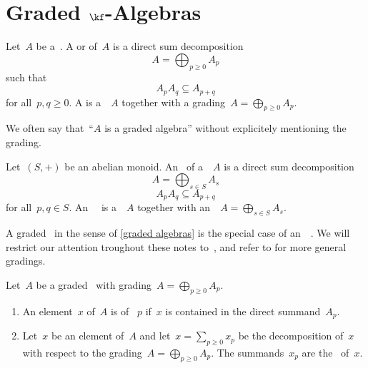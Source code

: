 \section{Graded \texorpdfstring{$\kf$}{k}-Algebras}


\begin{definition}
  \label{graded algebras}
  Let~$A$ be a~\algebra{$\kf$}.
  A  or  of~$A$ is a direct sum decomposition
  \[
    A
    =
    \bigoplus_{p \geq 0} A_p
  \]
  such that
  \[
    A_p A_q
    \subseteq
    A_{p+q}
  \]
  for all~$p, q \geq 0$.
  A  is a~\algebra{$\kf$}~$A$ together with a grading~$A = \bigoplus_{p \geq 0} A_p$.
\end{definition}


\begin{remark}
  We often say that~\enquote{$A$ is a graded algebra} without explicitely mentioning the grading.
\end{remark}


\begin{remark}
  Let~$(S, +)$ be an abelian monoid.
  An~ of a~\algebra{$\kf$}~$A$ is a direct sum decomposition
  \[
    A
    =
    \bigoplus_{s \in S}
    A_s
  \]
  \[
    A_p A_q
    \subseteq
    A_{p + q}
  \]
  for all~$p, q \in S$.
  An~~\algebra{$\kf$} is a~\algebra{$\kf$}~$A$ together with an~~$A = \bigoplus_{s \in S} A_s$.

  A graded~\algebra{$\kf$} in the sense of \cref{graded algebras} is the special case of an~{\graded{$\Natural$}}~\algebra{$\kf$}.
  We will restrict our attention troughout these notes to~{\gradings{$\Natural$}}, and refer to \cite[II.{\S}11, III.{\S}3]{bourbaki_algebra} for more general gradings.
\end{remark}


\begin{definition}
  Let~$A$ be a graded~{\algebra{$\kf$}} with grading~$A = \bigoplus_{p \geq 0} A_p$.
  \begin{enumerate}
    \item
      An element~$x$ of~$A$ is  of ~$p$ if~$x$ is contained in the direct summand~$A_p$.
    \item
      Let~$x$ be an element of~$A$ and let~$x = \sum_{p \geq 0} x_p$ be the decomposition of~$x$ with respect to the grading~$A = \bigoplus_{p \geq 0} A_p$.
      The summands~$x_p$ are the~ of~$x$.
  \end{enumerate}
\end{definition}



